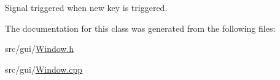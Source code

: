 Signal triggered when new key is triggered. 



The documentation for this class was generated from the following files\+:\begin{DoxyCompactItemize}
\item 
src/gui/\hyperlink{_window_8h}{Window.\+h}\item 
src/gui/\hyperlink{_window_8cpp}{Window.\+cpp}\end{DoxyCompactItemize}
